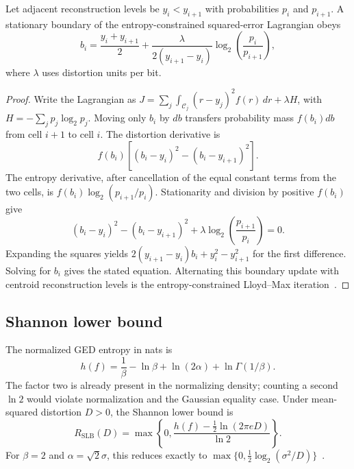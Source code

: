 \begin{theorem}
Let adjacent reconstruction levels be $y_i<y_{i+1}$ with probabilities $p_i$ and $p_{i+1}$. A stationary boundary of the entropy-constrained squared-error Lagrangian obeys
\begin{equation}
 b_i=\frac{y_i+y_{i+1}}{2}
 +\frac{\lambda}{2(y_{i+1}-y_i)}
 \log_2\!\left(\frac{p_i}{p_{i+1}}\right),
\end{equation}
where $\lambda$ uses distortion units per bit.
\end{theorem}
\begin{proof}
Write the Lagrangian as
$J=\sum_j\int_{\mathcal C_j}(r-y_j)^2f(r)\,dr+\lambda H$,
with $H=-\sum_jp_j\log_2p_j$. Moving only $b_i$ by $db$ transfers probability mass $f(b_i)db$ from cell $i+1$ to cell $i$. The distortion derivative is
\begin{equation}
 f(b_i)\left[(b_i-y_i)^2-(b_i-y_{i+1})^2\right].
\end{equation}
The entropy derivative, after cancellation of the equal constant terms from the two cells, is
$f(b_i)\log_2(p_{i+1}/p_i)$. Stationarity and division by positive $f(b_i)$ give
\begin{equation}
 (b_i-y_i)^2-(b_i-y_{i+1})^2
 +\lambda\log_2\!\left(\frac{p_{i+1}}{p_i}\right)=0.
\end{equation}
Expanding the squares yields
$2(y_{i+1}-y_i)b_i+y_i^2-y_{i+1}^2$ for the first difference. Solving for $b_i$ gives the stated equation. Alternating this boundary update with centroid reconstruction levels is the entropy-constrained Lloyd--Max iteration~\cite{lloyd1982least,max1960quantizing}.
\end{proof}

\subsection{Shannon lower bound}
The normalized GED entropy in nats is
\begin{equation}
 h(f)=\frac{1}{\beta}-\ln\beta+\ln(2\alpha)+\ln\Gamma(1/\beta).
\end{equation}
The factor two is already present in the normalizing density; counting a second $\ln2$ would violate normalization and the Gaussian equality case. Under mean-squared distortion $D>0$, the Shannon lower bound is
\begin{equation}
 R_{\mathrm{SLB}}(D)=\max\left\{0,\frac{h(f)-\frac12\ln(2\pi eD)}{\ln2}\right\}.
\end{equation}
For $\beta=2$ and $\alpha=\sqrt{2}\sigma$, this reduces exactly to
$\max\{0,\frac12\log_2(\sigma^2/D)\}$~\cite{shannon1959coding,cover2006elements}.
